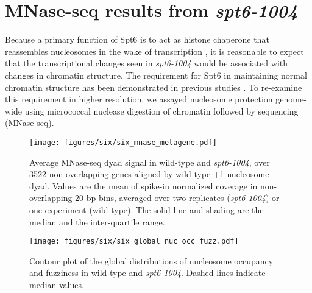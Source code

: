 \section{MNase-seq results from \textit{spt6-1004}}

Because a primary function of Spt6 is to act as histone chaperone that reassembles nucleosomes in the wake of transcription \citep{duina2011}, it is reasonable to expect that the transcriptional changes seen in \textit{spt6-1004} would be associated with changes in chromatin structure.
The requirement for Spt6 in maintaining normal chromatin structure has been demonstrated in previous studies \citep{bortvin1996, ivanovska2011, jeronimo2015, kaplan2003, perales2013, vanbakel2013}.
To re-examine this requirement in higher resolution, we assayed nucleosome protection genome-wide using micrococcal nuclease digestion of chromatin followed by sequencing (MNase-seq).

\begin{figure}[H]
    \centering
    \begin{minipage}[t]{2.875in}
        \centering
        \texttt{[image: figures/six/six\_mnase\_metagene.pdf]}
        \caption[Average MNase-seq dyad signal in wild-type and \textit{spt6-1004}, over non-overlapping genes aligned by wild-type +1 nucleosome dyad.]{Average MNase-seq dyad signal in wild-type and \textit{spt6-1004}, over 3522 non-overlapping genes aligned by wild-type +1 nucleosome dyad. Values are the mean of spike-in normalized coverage in non-overlapping 20 bp bins, averaged over two replicates (\textit{spt6-1004}) or one experiment (wild-type). The solid line and shading are the median and the inter-quartile range.}
        \label{fig:six_mnase_metagene}
    \end{minipage}\hfill
    \begin{minipage}[t]{2.875in}
        \centering
        \texttt{[image: figures/six/six\_global\_nuc\_occ\_fuzz.pdf]}
        \caption[Contour plot of nucleosome occupancy and fuzziness in wild-type and \textit{spt6-1004}.]{Contour plot of the global distributions of nucleosome occupancy and fuzziness in wild-type and \textit{spt6-1004}. Dashed lines indicate median values.}
        \label{fig:six_global_nuc_occ_fuzz}
    \end{minipage}
\end{figure}


